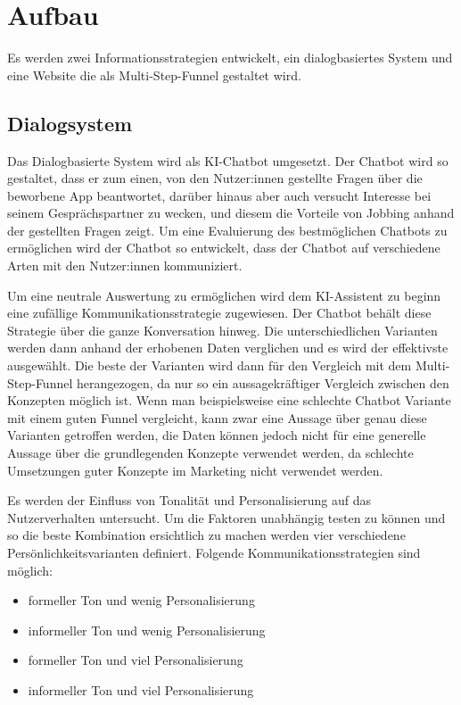 \setauthor{\firstauthor}
\section{Aufbau}
Es werden zwei Informationsstrategien entwickelt, ein dialogbasiertes System und 
eine Website die als Multi-Step-Funnel gestaltet wird.

\subsection{Dialogsystem}

Das Dialogbasierte System
wird als KI-Chatbot umgesetzt. Der Chatbot wird so gestaltet, dass er zum einen,
von den Nutzer:innen gestellte Fragen über die beworbene App beantwortet, darüber hinaus
aber auch versucht Interesse bei seinem Gesprächspartner zu wecken, und diesem
die Vorteile von Jobbing anhand der gestellten Fragen zeigt.
Um eine Evaluierung des bestmöglichen Chatbots zu ermöglichen wird der Chatbot
so entwickelt, dass der Chatbot auf verschiedene Arten mit den Nutzer:innen kommuniziert.

Um eine neutrale Auswertung zu ermöglichen wird dem KI-Assistent zu beginn eine
zufällige Kommunikationsstrategie zugewiesen. Der Chatbot behält diese Strategie
über die ganze Konversation hinweg. Die unterschiedlichen Varianten werden dann
anhand der erhobenen Daten verglichen und es wird der effektivste ausgewählt. 
Die beste der Varianten wird dann für den Vergleich mit dem Multi-Step-Funnel
herangezogen, da nur so ein aussagekräftiger Vergleich zwischen den Konzepten
möglich ist. Wenn man beispielsweise eine schlechte Chatbot Variante mit einem
guten Funnel vergleicht, kann zwar eine Aussage über genau diese Varianten 
getroffen werden, die Daten können jedoch nicht für eine generelle Aussage
über die grundlegenden Konzepte verwendet werden, da schlechte Umsetzungen 
guter Konzepte im Marketing nicht verwendet werden.

Es werden der Einfluss von Tonalität und Personalisierung auf das Nutzerverhalten
untersucht. Um die Faktoren unabhängig testen zu können und so die beste Kombination
ersichtlich zu machen werden vier verschiedene Persönlichkeitsvarianten definiert.
Folgende Kommunikationsstrategien sind möglich:

\begin{itemize}
    \item formeller Ton und wenig Personalisierung
    \item informeller Ton und wenig Personalisierung
    \item formeller Ton und viel Personalisierung
    \item informeller Ton und viel Personalisierung
\end{itemize}

